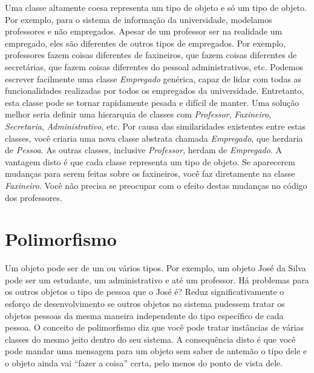 Uma classe altamente coesa representa um tipo de objeto e só um tipo de objeto. Por exemplo, para o sistema de informação da universidade, modelamos professores e não empregados. Apesar de um professor ser na realidade um empregado, eles são diferentes de outros tipos de empregados. Por exemplo, professores fazem coisas diferentes de faxineiros, que fazem coisas diferentes de secretárias, que fazem coisas diferentes do pessoal administrativos, etc. Podemos escrever facilmente uma classe \emph{Empregado} genérica, capaz de lidar com todas as funcionalidades realizadas por todos os empregados da universidade. Entretanto, esta classe pode se tornar rapidamente pesada e difícil de manter. Uma solução melhor seria definir uma hierarquia de classes com \emph{Professor}, \emph{Faxineiro}, \emph{Secretaria}, \emph{Administrativo}, etc. Por causa das similaridades existentes entre estas classes, você criaria uma nova classe abstrata chamada \emph{Empregado}, que herdaria de \emph{Pessoa}. As outras classes, inclusive \emph{Professor}, herdam de \emph{Empregado}. A vantagem disto é que cada classe representa um tipo de objeto. Se aparecerem mudanças para serem feitas sobre os faxineiros, você faz diretamente na classe \emph{Faxineiro}. Você não precisa se preocupar com o efeito destas mudanças no código dos professores. 

\section{Polimorfismo}

Um objeto pode ser de um ou vários tipos. Por exemplo, um objeto José da Silva pode ser um estudante, um administrativo e até um professor. Há problemas para os outros objetos o tipo de pessoa que o José é? Reduz significativamente o esforço de desenvolvimento se outros objetos no sistema pudessem tratar os objetos pessoas da mesma maneira independente do tipo específico de cada pessoa. O conceito de polimorfismo diz que você pode tratar instâncias de várias classes do mesmo jeito dentro do seu sistema. A consequência disto é que você pode mandar uma mensagem para um objeto sem saber de antemão o tipo dele e o objeto ainda vai ``fazer a coisa'' certa, pelo menos do ponto de vista dele.


